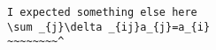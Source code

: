 \begin{verbatim}
I expected something else here
\sum _{j}\delta _{ij}a_{j}=a_{i}
~~~~~~~~^
\end{verbatim}
